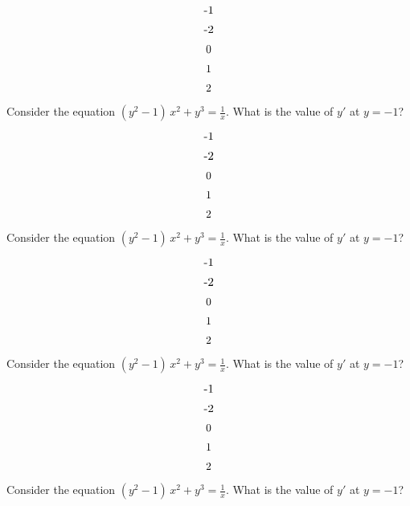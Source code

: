 \documentclass[amsfonts,bezier,leqno,fleqn,12pt,a4paper]{article}
\def \v2{\vspace {3.5cm}}
\def \be{\begin{equation}}
\def \ee{\end{equation}}
\renewcommand{\sc}{\vspace {0.3in} \setcounter{equation}{0}}
\begin{document}
\begin{large}
			\be
			$-1$
			\ee
		
			\be
			$-2$
			\ee
		
			\be
			$0$
			\ee
		
			\be
			$1$
			\ee
		
			\be
			$2$
			\ee
		
\v2

\item %
Consider the equation $\displaystyle (y^2-1)\,x^2+y^3=\frac{1}{x}.$ What is the value of $y'$ at $y=-1$?
\sc

			\be
			$-1$
			\ee
		
			\be
			$-2$
			\ee
		
			\be
			$0$
			\ee
		
			\be
			$1$
			\ee
		
			\be
			$2$
			\ee
		
\newpage

\item %
Consider the equation $\displaystyle (y^2-1)\,x^2+y^3=\frac{1}{x}.$ What is the value of $y'$ at $y=-1$?
\sc

			\be
			$-1$
			\ee
		
			\be
			$-2$
			\ee
		
			\be
			$0$
			\ee
		
			\be
			$1$
			\ee
		
			\be
			$2$
			\ee
		
\v2

\item %
Consider the equation $\displaystyle (y^2-1)\,x^2+y^3=\frac{1}{x}.$ What is the value of $y'$ at $y=-1$?
\sc

			\be
			$-1$
			\ee
		
			\be
			$-2$
			\ee
		
			\be
			$0$
			\ee
		
			\be
			$1$
			\ee
		
			\be
			$2$
			\ee
		
\newpage

\item %
Consider the equation $\displaystyle (y^2-1)\,x^2+y^3=\frac{1}{x}.$ What is the value of $y'$ at $y=-1$?
\sc


\end{large}
\end{document}
